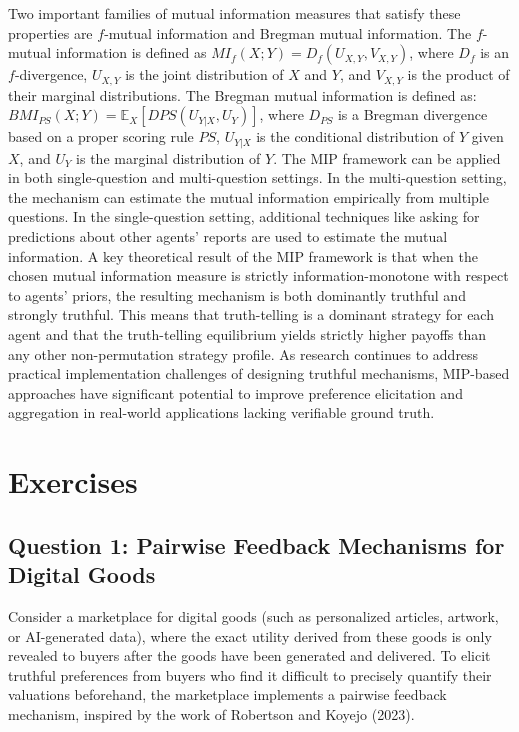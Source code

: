 \documentclass[
  letterpaper,
  numbers=noenddot,
  DIV=11]{scrreprt}
\theoremstyle{plain}
\theoremstyle{definition}
\theoremstyle{remark}
\begin{document}
Two important families of mutual information measures that satisfy these
properties are \(f\)-mutual information and Bregman mutual information.
The \(f\)-mutual information is defined as
\(MI_f(X; Y) = D_f(U_{X,Y}, V_{X,Y})\), where \(D_f\) is an
\(f\)-divergence, \(U_{X,Y}\) is the joint distribution of \(X\) and
\(Y\), and \(V_{X,Y}\) is the product of their marginal distributions.
The Bregman mutual information is defined as:
\(BMI_{PS}(X; Y) = \mathbb{E}_{X} [D{PS}(U_{Y|X}, U_Y)]\), where
\(D_{PS}\) is a Bregman divergence based on a proper scoring rule
\(PS\), \(U_{Y|X}\) is the conditional distribution of \(Y\) given
\(X\), and \(U_Y\) is the marginal distribution of \(Y\). The MIP
framework can be applied in both single-question and multi-question
settings. In the multi-question setting, the mechanism can estimate the
mutual information empirically from multiple questions. In the
single-question setting, additional techniques like asking for
predictions about other agents' reports are used to estimate the mutual
information. A key theoretical result of the MIP framework is that when
the chosen mutual information measure is strictly information-monotone
with respect to agents' priors, the resulting mechanism is both
dominantly truthful and strongly truthful. This means that truth-telling
is a dominant strategy for each agent and that the truth-telling
equilibrium yields strictly higher payoffs than any other
non-permutation strategy profile. As research continues to address
practical implementation challenges of designing truthful mechanisms,
MIP-based approaches have significant potential to improve preference
elicitation and aggregation in real-world applications lacking
verifiable ground truth.

\section{Exercises}\label{exercises-3}

\subsection{Question 1: Pairwise Feedback Mechanisms for Digital
Goods}\label{question-1-pairwise-feedback-mechanisms-for-digital-goods}

Consider a marketplace for digital goods (such as personalized articles,
artwork, or AI-generated data), where the exact utility derived from
these goods is only revealed to buyers after the goods have been
generated and delivered. To elicit truthful preferences from buyers who
find it difficult to precisely quantify their valuations beforehand, the
marketplace implements a pairwise feedback mechanism, inspired by the
work of Robertson and Koyejo (2023).
\end{document}
